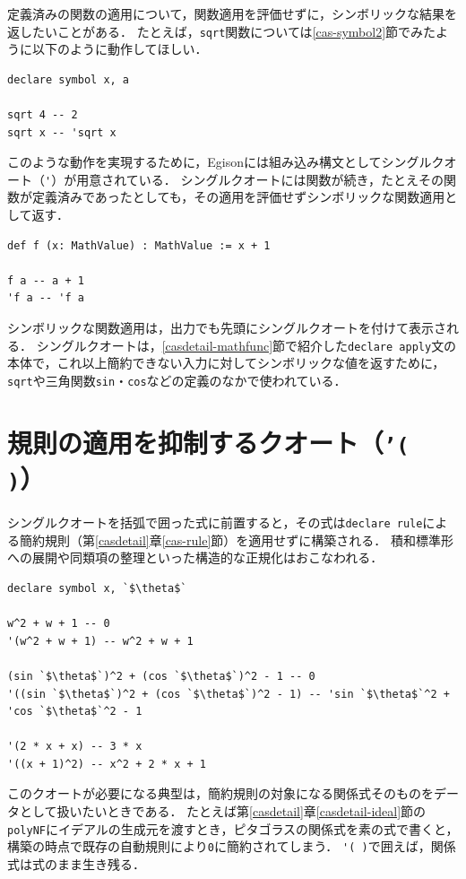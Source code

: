 定義済みの関数の適用について，関数適用を評価せずに，シンボリックな結果を返したいことがある．
たとえば，\lstinline{sqrt}関数については\ref{cas-symbol2}節でみたように以下のように動作してほしい．
\begin{lstlisting}[language=egison,numbers=none]
declare symbol x, a

sqrt 4 -- 2
sqrt x -- 'sqrt x
\end{lstlisting}
このような動作を実現するために，Egisonには組み込み構文としてシングルクオート（\lstinline{'}）が用意されている．
シングルクオートには関数が続き，たとえその関数が定義済みであったとしても，その適用を評価せずシンボリックな関数適用として返す．
\begin{lstlisting}[language=egison,numbers=none]
def f (x: MathValue) : MathValue := x + 1

f a -- a + 1
'f a -- 'f a
\end{lstlisting}
シンボリックな関数適用は，出力でも先頭にシングルクオートを付けて表示される．
シングルクオートは，\ref{casdetail-mathfunc}節で紹介した\lstinline{declare apply}文の本体で，これ以上簡約できない入力に対してシンボリックな値を返すために，\lstinline{sqrt}や三角関数\lstinline{sin}・\lstinline{cos}などの定義のなかで使われている．

\section{規則の適用を抑制するクオート（\texttt{'( )}）}\label{mexpr-rsquote}

シングルクオートを括弧で囲った式に前置すると，その式は\lstinline{declare rule}による簡約規則（第\ref{casdetail}章\ref{cas-rule}節）を適用せずに構築される．
積和標準形への展開や同類項の整理といった構造的な正規化はおこなわれる．
\begin{lstlisting}[language=egison,numbers=none]
declare symbol x, `$\theta$`

w^2 + w + 1 -- 0
'(w^2 + w + 1) -- w^2 + w + 1

(sin `$\theta$`)^2 + (cos `$\theta$`)^2 - 1 -- 0
'((sin `$\theta$`)^2 + (cos `$\theta$`)^2 - 1) -- 'sin `$\theta$`^2 + 'cos `$\theta$`^2 - 1

'(2 * x + x) -- 3 * x
'((x + 1)^2) -- x^2 + 2 * x + 1
\end{lstlisting}
このクオートが必要になる典型は，簡約規則の対象になる関係式そのものをデータとして扱いたいときである．
たとえば第\ref{casdetail}章\ref{casdetail-ideal}節の\lstinline{polyNF}にイデアルの生成元を渡すとき，ピタゴラスの関係式を素の式で書くと，構築の時点で既存の自動規則により\lstinline{0}に簡約されてしまう．
\lstinline{'( )}で囲えば，関係式は式のまま生き残る．

